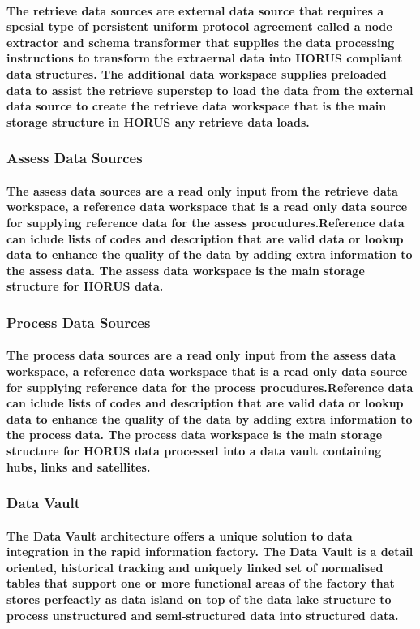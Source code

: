 \documentclass{acm_proc_article-sp}
\begin{document}
\paragraph{The retrieve data sources are external data source that requires a spesial type of persistent uniform protocol agreement called a node extractor and schema transformer that supplies the data processing instructions to transform the extraernal data into HORUS compliant data structures. The additional data workspace supplies preloaded data to assist the retrieve superstep to load the data from the external data source to create the retrieve data workspace that is the main storage structure in HORUS any retrieve data loads.}
\subsubsection{Assess Data Sources}
\paragraph{The assess data sources are a read only input from the retrieve data workspace, a reference data workspace that is a read only data source for supplying reference data for the assess procudures.Reference data can iclude lists of codes and description that are valid data or lookup data to enhance the quality of the data by adding extra information to the assess data. The assess data workspace is the main storage structure for HORUS data.}
\subsubsection{Process Data Sources}
\paragraph{The process data sources are a read only input from the assess data workspace, a reference data workspace that is a read only data source for supplying reference data for the process procudures.Reference data can iclude lists of codes and description that are valid data or lookup data to enhance the quality of the data by adding extra information to the process data. The process data workspace is the main storage structure for HORUS data processed into a data vault containing hubs, links and satellites. }
\subsubsection{Data Vault}
\paragraph{The Data Vault architecture offers a unique solution to data integration in the rapid information factory. The Data Vault is a detail oriented, historical tracking and uniquely linked set of normalised tables that support one or more functional areas of the factory that stores perfeactly as data island on top of the data lake structure to process unstructured and semi-structured data into structured data.}
\end{document}
